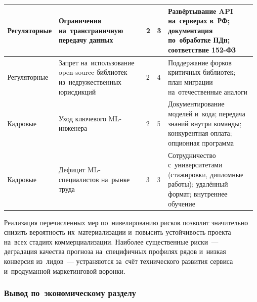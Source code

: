 {\begin{longtable}{L{2.0cm} L{4.2cm} C{0.9cm} C{0.9cm} L{6.0cm}}
\midrule
Регуляторные & Ограничения на~трансграничную передачу данных & 2 & 3 & Развёртывание API на~серверах в~РФ; документация по~обработке ПДн; соответствие 152-ФЗ \\
\midrule
Регуляторные & Запрет на~использование open-source библиотек из~недружественных юрисдикций & 2 & 4 & Поддержание форков критичных библиотек; план миграции на~отечественные аналоги \\
\midrule
Кадровые & Уход ключевого ML-инженера & 2 & 5 & Документирование моделей и~кода; передача знаний внутри команды; конкурентная оплата; опционная программа \\
\midrule
Кадровые & Дефицит ML-специалистов на~рынке труда & 3 & 3 & Сотрудничество с~университетами (стажировки, дипломные работы); удалённый формат; внутреннее обучение \\
\bottomrule
\end{longtable}
}

Реализация перечисленных мер по~нивелированию рисков позволит значительно
снизить вероятность их~материализации и~повысить устойчивость проекта на~всех
стадиях коммерциализации. Наиболее существенные риски~--- деградация качества
прогноза на~специфичных профилях рядов и~низкая конверсия из~лидов~---
устраняются за~счёт технического развития сервиса и~продуманной маркетинговой
воронки.

\subsubsection{Вывод по~экономическому разделу}

